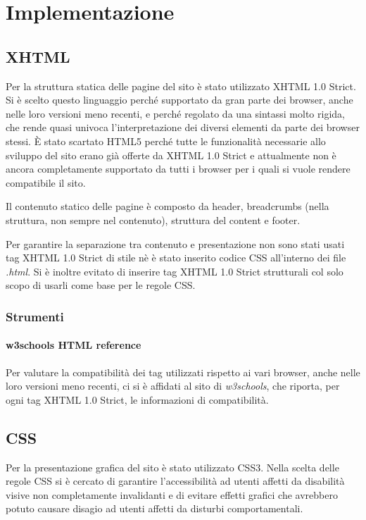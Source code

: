 \section{Implementazione}
\label{implementazione}

\subsection{XHTML}
\label{implementazione-html}
Per la struttura statica delle pagine del sito è stato utilizzato XHTML 1.0 Strict. Si è scelto questo linguaggio perché supportato da gran parte dei browser, anche nelle loro versioni meno recenti, e perché regolato da una sintassi molto rigida, che rende quasi univoca l'interpretazione dei diversi elementi da parte dei browser stessi. È stato scartato HTML5 perché tutte le funzionalità necessarie allo sviluppo del sito erano già offerte da XHTML 1.0 Strict e attualmente non è ancora completamente supportato da tutti i browser per i quali si vuole rendere compatibile il sito.

Il contenuto statico delle pagine è composto da header, breadcrumbs (nella struttura, non sempre nel contenuto), struttura del content e footer.

Per garantire la separazione tra contenuto e presentazione non sono stati usati tag XHTML 1.0 Strict di stile nè è stato inserito codice CSS all'interno dei file \textit{.html}. Si è inoltre evitato di inserire tag XHTML 1.0 Strict strutturali col solo scopo di usarli come base per le regole CSS. 

\subsubsection{Strumenti}
\label{implementazione-html-strumenti}

\paragraph{w3schools HTML reference}
\label{implementazione-html-strumenti-w3schools-reference}
Per valutare la compatibilità dei tag utilizzati rispetto ai vari browser, anche nelle loro versioni meno recenti, ci si è affidati al sito di \textit{w3schools}, che riporta, per ogni tag XHTML 1.0 Strict, le informazioni di compatibilità.


\subsection{CSS}
\label{implementazione-css}
Per la presentazione grafica del sito è stato utilizzato CSS3. Nella scelta delle regole CSS si è cercato di garantire l'accessibilità ad utenti affetti da disabilità visive non completamente invalidanti e di evitare effetti grafici che avrebbero potuto causare disagio ad utenti affetti da disturbi comportamentali.

